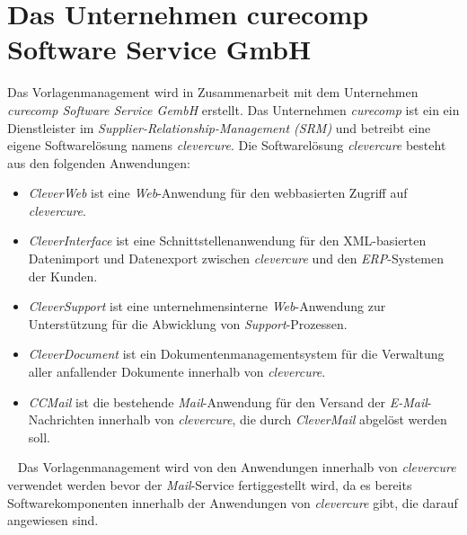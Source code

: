 \section{Das Unternehmen curecomp Software Service GmbH}
Das Vorlagenmanagement wird in Zusammenarbeit mit dem Unternehmen \emph{curecomp Software Service GembH} erstellt. Das Unternehmen \emph{curecomp} ist ein ein Dienstleister im \emph{Supplier-Relationship-Management (SRM)} und betreibt eine eigene Softwarelösung namens \emph{clevercure}. Die Softwarelösung \emph{clevercure} besteht aus den folgenden Anwendungen:
\begin{itemize}
	\item\emph{CleverWeb} ist eine \emph{Web}-Anwendung für den webbasierten Zugriff auf \emph{clevercure}.
	\item\emph{CleverInterface} ist eine Schnittstellenanwendung für den XML-basierten Datenimport und Datenexport zwischen \emph{clevercure} und den \emph{ERP}-Systemen der Kunden.
	\item\emph{CleverSupport} ist eine unternehmensinterne \emph{Web}-Anwendung zur Unterstützung für die Abwicklung von \emph{Support}-Prozessen.
	\item\emph{CleverDocument} ist ein Dokumentenmanagementsystem für die Verwaltung aller anfallender Dokumente innerhalb von \emph{clevercure}.
	\item\emph{CCMail} ist die bestehende \emph{Mail}-Anwendung für den Versand der \emph{E-Mail}-Nachrichten innerhalb von \emph{clevercure}, die durch \emph{CleverMail} abgelöst werden soll.
\end{itemize}
\ \newline
Das Vorlagenmanagement wird von den Anwendungen innerhalb von \emph{clevercure} verwendet werden bevor der \emph{Mail}-Service fertiggestellt wird, da es bereits Softwarekomponenten innerhalb der Anwendungen von \emph{clevercure} gibt, die darauf angewiesen sind.

